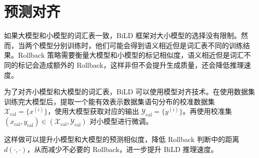 \section{预测对齐}

如果大模型和小模型的词汇表一致，BiLD 框架对大小模型的选择没有限制。然而，当两个模型分别训练时，他们可能会得到语义相近但是词汇表不同的训练结果。Rollback 策略需要衡量大模型和小模型的标记相似度，语义相近但是词汇不同的标记会造成额外的 Rollback，这样非但不会提升生成质量，还会降低推理速度。

为了对齐小模型和大模型的词汇表，BiLD 可以使用模型对齐技术。在使用数据集训练完大模型后，提取一个能有效表示数据集语句分布的校准数据集 $\mathcal{X}_{\mathrm{cal}}=\{x^{(i)}\}$，使用大模型获取对应的输出 $\mathcal{Y}_{\mathrm{cal}}=\{y^{(i)}\}$。再使用校准集 $\left(x_{\mathrm{cal}}, y_{\mathrm{cal}}\right) \in\left(\mathcal{X}_{\mathrm{cal}}, \mathcal{Y}_{\mathrm{cal}}\right)$ 对小模型进行微调。

这样做可以提升小模型和大模型的预测相似度，降低 Rollback 判断中的距离 $d(\cdot,\cdot)$，从而减少不必要的 Rollback，进一步提升 BiLD 推理速度。
